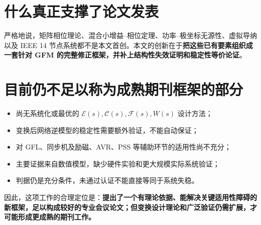 \documentclass[11pt,a4paper]{ctexart}
\begin{document}
\section{什么真正支撑了论文发表}


\medskip
严格地说，矩阵相位理论、混合小增益--相位定理、功率--极坐标无源性、虚拟导纳以及 IEEE 14 节点系统都不是本文首创。本文的创新在于\textbf{把这些已有要素组织成一套针对 GFM 的完整修正框架，并补上结构性失效证明和稳定性等价论证}。

\section{目前仍不足以称为成熟期刊框架的部分}

\begin{itemize}
  \item 尚无系统化或最优的 $\mathcal E(s),\mathcal C(s),\mathcal F(s),W(s)$ 设计方法；
  \item 变换后网络逆模型的稳定性需要额外验证，不能自动保证；
  \item 对 GFL、同步机及励磁、AVR、PSS 等辅助环节的适用性尚不充分；
  \item 主要证据来自数值模型，缺少硬件实验和更大规模实际系统验证；
  \item 判据仍是充分条件，未通过认证不能直接等同于系统失稳。
\end{itemize}

因此，这项工作的合理定位是：\textbf{提出了一个有理论依据、能解决关键适用性障碍的新框架，足以构成较好的专业会议论文；但变换设计理论和广泛验证仍需扩展，才可能形成更成熟的期刊工作。}
\end{document}
